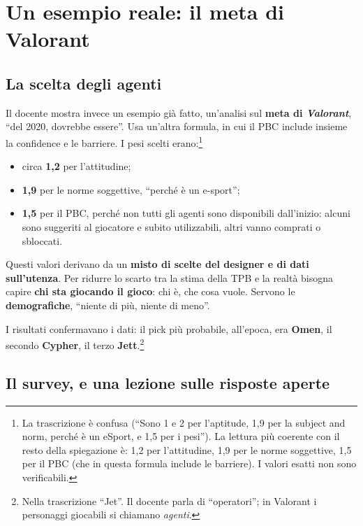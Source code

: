 \section{Un esempio reale: il meta di Valorant}
\label{gd9:sec:valorant}

\subsection{La scelta degli agenti}

Il docente mostra invece un esempio già fatto, un'analisi sul \textbf{meta di
\emph{Valorant}}, ``del 2020, dovrebbe essere''. Usa un'altra formula, in cui
il PBC include insieme la confidence e le barriere. I pesi scelti
erano:\footnote{La trascrizione è confusa (``Sono 1 e 2 per l'aptitude, 1,9
per la subject and norm, perché è un eSport, e 1,5 per i pesi''). La lettura
più coerente con il resto della spiegazione è: 1,2 per l'attitudine, 1,9 per
le norme soggettive, 1,5 per il PBC (che in questa formula include le
barriere). I valori esatti non sono verificabili.}
\begin{itemize}
  \item circa \textbf{1,2} per l'attitudine;
  \item \textbf{1,9} per le norme soggettive, ``perché è un e-sport'';
  \item \textbf{1,5} per il PBC, perché non tutti gli agenti sono
        disponibili dall'inizio: alcuni sono suggeriti al giocatore e subito
        utilizzabili, altri vanno comprati o sbloccati.
\end{itemize}
Questi valori derivano da un \textbf{misto di scelte del designer e di dati
sull'utenza}. Per ridurre lo scarto tra la stima della TPB e la realtà
bisogna capire \textbf{chi sta giocando il gioco}: chi è, che cosa vuole.
Servono le \textbf{demografiche}, ``niente di più, niente di meno''.

I risultati confermavano i dati: il pick più probabile, all'epoca, era
\textbf{Omen}, il secondo \textbf{Cypher}, il terzo
\textbf{Jett}.\footnote{Nella trascrizione ``Jet''. Il docente parla di
``operatori''; in Valorant i personaggi giocabili si chiamano
\emph{agenti}.}

\subsection{Il survey, e una lezione sulle risposte aperte}

